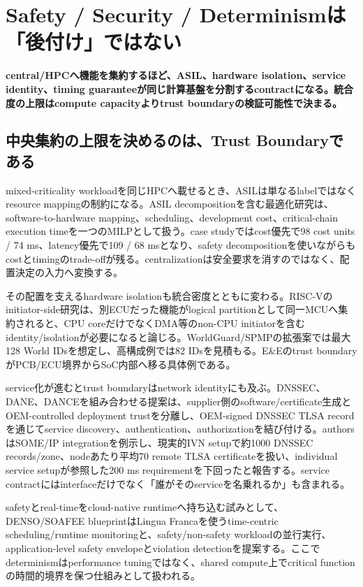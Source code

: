 \section{Safety / Security / Determinismは「後付け」ではない}
\noindent\textbf{central/HPCへ機能を集約するほど、ASIL、hardware isolation、service identity、timing guaranteeが同じ計算基盤を分割するcontractになる。統合度の上限はcompute capacityよりtrust boundaryの検証可能性で決まる。}\autocite{src-85ca0561a52b,src-eac8b3c725a2,src-f657aea94b5e,src-fe402f610af7}

\begin{surveyarticlebody}
\subsection{中央集約の上限を決めるのは、Trust Boundaryである}

mixed-criticality workloadを同じHPCへ載せるとき、ASILは単なるlabelではなくresource mappingの制約になる。ASIL decompositionを含む最適化研究は、software-to-hardware mapping、scheduling、development cost、critical-chain execution timeを一つのMILPとして扱う。case studyではcost優先で98 cost units / 74 ms、latency優先で109 / 68 msとなり、safety decompositionを使いながらもcostとtimingのtrade-offが残る。centralizationは安全要求を消すのではなく、配置決定の入力へ変換する。\autocite{src-f657aea94b5e}

その配置を支えるhardware isolationも統合密度とともに変わる。RISC-Vのinitiator-side研究は、別ECUだった機能がlogical partitionとして同一MCUへ集約されると、CPU coreだけでなくDMA等のnon-CPU initiatorを含むidentity/isolationが必要になると論じる。WorldGuard/SPMPの拡張案では最大128 World IDsを想定し、高構成例では82 IDsを見積もる。E\&Eのtrust boundaryがPCB/ECU境界からSoC内部へ移る具体例である。\autocite{src-fe402f610af7}

service化が進むとtrust boundaryはnetwork identityにも及ぶ。DNSSEC、DANE、DANCEを組み合わせる提案は、supplier側のsoftware/certificate生成とOEM-controlled deployment trustを分離し、OEM-signed DNSSEC TLSA recordを通じてservice discovery、authentication、authorizationを結び付ける。authorsはSOME/IP integrationを例示し、現実的IVN setupで約1000 DNSSEC records/zone、nodeあたり平均70 remote TLSA certificateを扱い、individual service setupが参照した200 ms requirementを下回ったと報告する。service contractにはinterfaceだけでなく「誰がそのserviceを名乗れるか」も含まれる。\autocite{src-85ca0561a52b}

safetyとreal-timeをcloud-native runtimeへ持ち込む試みとして、DENSO/SOAFEE blueprintはLingua Francaを使うtime-centric scheduling/runtime monitoringと、safety/non-safety workloadの並行実行、application-level safety envelopeとviolation detectionを提案する。ここでdeterminismはperformance tuningではなく、shared compute上でcritical functionの時間的境界を保つ仕組みとして扱われる。\autocite{src-eac8b3c725a2}


\end{surveyarticlebody}
